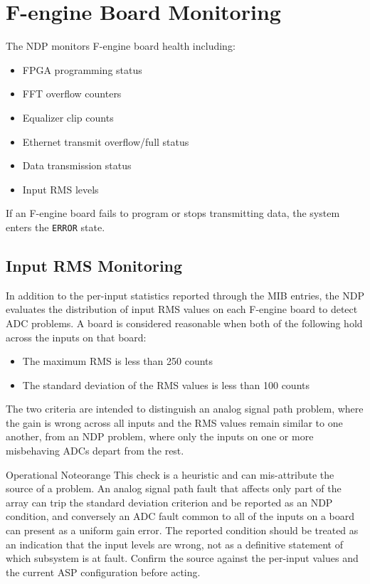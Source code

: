 \section{F-engine Board Monitoring}

The NDP monitors F-engine board health including:
\begin{itemize}
    \item FPGA programming status
    \item FFT overflow counters
    \item Equalizer clip counts
    \item Ethernet transmit overflow/full status
    \item Data transmission status
    \item Input RMS levels
\end{itemize}

If an F-engine board fails to program or stops transmitting data, the system enters the \texttt{ERROR} state.

\subsection{Input RMS Monitoring}

In addition to the per-input statistics reported through the  MIB entries, the NDP evaluates the distribution of input RMS values on each F-engine board to detect ADC problems.  A board is considered reasonable when both of the following hold across the inputs on that board:

\begin{itemize}
    \item The maximum RMS is less than 250 counts
    \item The standard deviation of the RMS values is less than 100 counts
\end{itemize}

The two criteria are intended to distinguish an analog signal path problem, where the gain is wrong across all inputs and the RMS values remain similar to one another, from an NDP problem, where only the inputs on one or more misbehaving ADCs depart from the rest.

\begin{calloutBox}{Operational Note}{orange}
This check is a heuristic and can mis-attribute the source of a problem.  An analog signal path fault that affects only part of the array can trip the standard deviation criterion and be reported as an NDP condition, and conversely an ADC fault common to all of the inputs on a board can present as a uniform gain error.  The reported condition should be treated as an indication that the input levels are wrong, not as a definitive statement of which subsystem is at fault.  Confirm the source against the per-input  values and the current ASP configuration before acting.
\end{calloutBox}

